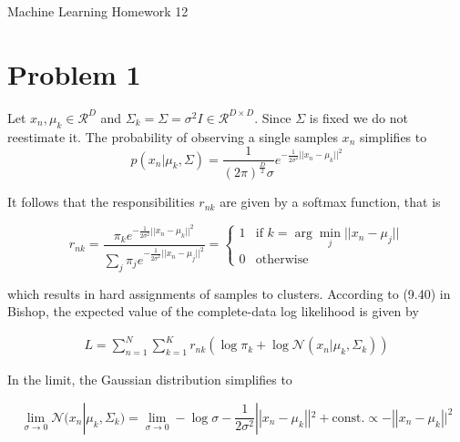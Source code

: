 \documentclass[12pt]{article}
\begin{document}
\begin{center}
{\Large Machine Learning Homework 12} \\[.3in]
\end{center}
\vspace*{.5in}


\section*{Problem 1}

Let $x_n, \mu_k \in \mathcal{R}^D$ and $\Sigma_k = \Sigma = \sigma^2I \in \mathcal{R}^{D \times D}$. Since $\Sigma$ is fixed we do not reestimate it. The probability of observing a single samples $x_n$ simplifies to 
\begin{equation}
 p(x_n|\mu_k, \Sigma) = \frac{1}{(2 \pi )^\frac{D}{2} \sigma} e^{-\frac{1}{2 \sigma^2} ||x_n - \mu_k||^2}
\end{equation}

It follows that the responsibilities $r_{nk}$ are given by a softmax function, that is

\begin{equation}
 r_{nk} = \frac{ \pi_k e^{-\frac{1}{2 \sigma^2} ||x_n - \mu_k||^2} } { \sum_j \pi_j e^{-\frac{1}{2 \sigma^2} ||x_n - \mu_j||^2}} = 
 \begin{cases}
  1 & \text{if } k = \arg \min_j ||x_n - \mu_j|| \\                                                                                                                                  
  0 & \text{otherwise}                                                                                                                                 \end{cases}
\end{equation}

which results in hard assignments of samples to clusters. According to (9.40) in Bishop, the expected value of the complete-data log likelihood is given by 

\begin{equation}
 \begin{align}
  L = \sum_{n=1}^{N} \sum_{k=1}^{K} r_{nk} \left( \log{\pi_k} + \log{\mathcal{N}(x_n|\mu_k, \Sigma_k)} \right)
 \end{align}
\end{equation}

In the limit, the Gaussian distribution simplifies to

\begin{equation}
 \lim_{\sigma \rightarrow 0} \mathcal{N}(x_n|\mu_k, \Sigma_k) = \lim_{\sigma \rightarrow 0} -\log{\sigma} - \frac{1}{2 \sigma^2} ||x_n - \mu_k||^2 + \text{const.} \propto -||x_n - \mu_k||^2
\end{equation}
\end{document}
